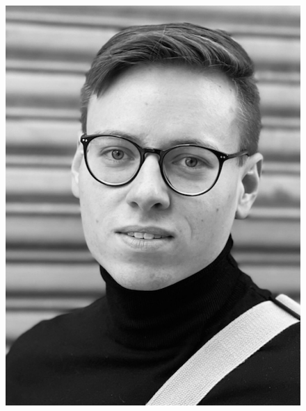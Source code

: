 \documentclass[10pt, a4paper,onecolumn ,titlepage]{article}
\begin{document}
\begin{titlepage}
\begin{center}
\begin{figure}[H]
\begin{minipage}[b]{.13\linewidth}
                    \includegraphics[width=\linewidth]{author_pictures/chris_2}
                \end{minipage}\label{fig:umut}
                \hspace{.005\linewidth}%
                \begin{minipage}[b]{.13\linewidth} %

\end{minipage}
\end{figure}
\end{center}
\end{titlepage}
\end{document}
